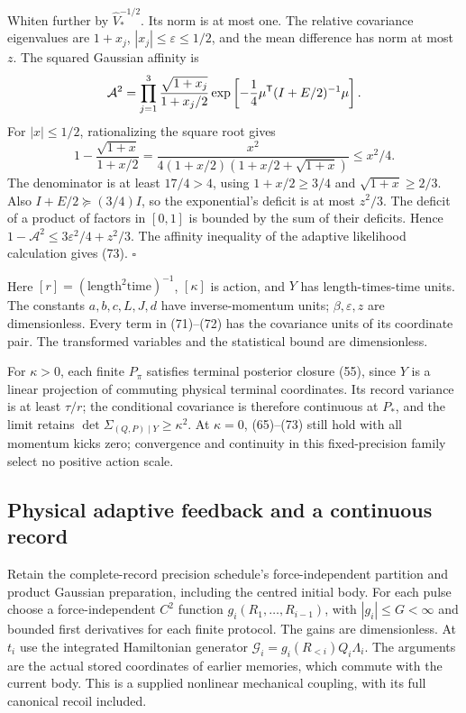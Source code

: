 \documentclass[11pt,a4paper]{article}
\begin{document}
Whiten further by \(\widehat V_*^{-1/2}\). Its norm is at most one. The
relative covariance eigenvalues are \(1+x_j\),
\(|x_j|\le\varepsilon\le1/2\), and the mean difference has norm at most
\(z\). The squared Gaussian affinity is \[\mathcal A^2=\prod_{j=1}^3
 \frac{\sqrt{1+x_j}}{1+x_j/2}
 \exp\left[-\frac14\mu^{\sf T}
                         (I+E/2)^{-1}\mu\right].\] For \(|x|\le1/2\),
rationalizing the square root gives \[1-\frac{\sqrt{1+x}}{1+x/2}
=\frac{x^2}{4(1+x/2)(1+x/2+\sqrt{1+x})}\le x^2/4.\] The denominator is
at least \(17/4>4\), using \(1+x/2\ge3/4\) and \(\sqrt{1+x}\ge2/3\).
Also \(I+E/2\succeq(3/4)I\), so the exponential's deficit is at most
\(z^2/3\). The deficit of a product of factors in \([0,1]\) is bounded
by the sum of their deficits. Hence
\(1-\mathcal A^2\le3\varepsilon^2/4+z^2/3\). The affinity inequality of
the adaptive likelihood calculation gives (73). \(\square\)

Here \([r]=(\text{length}^2\text{time})^{-1}\), \([\kappa]\) is action,
and \(Y\) has length-times-time units. The constants \(a,b,c,L,J,d\)
have inverse-momentum units; \(\beta,\varepsilon,z\) are dimensionless.
Every term in (71)--(72) has the covariance units of its coordinate
pair. The transformed variables and the statistical bound are
dimensionless.

For \(\kappa>0\), each finite \(P_\pi\) satisfies terminal posterior
closure (55), since \(Y\) is a linear projection of commuting physical
terminal coordinates. Its record variance is at least \(\tau/r\); the
conditional covariance is therefore continuous at \(P_*\), and the limit
retains \(\det\Sigma_{(Q,P)\mid Y}\ge\kappa^2\). At \(\kappa=0\),
(65)--(73) still hold with all momentum kicks zero; convergence and
continuity in this fixed-precision family select no positive action
scale.

\hypertarget{physical-adaptive-feedback-and-a-continuous-record}{%
\subsection{Physical adaptive feedback and a continuous
record}\label{physical-adaptive-feedback-and-a-continuous-record}}

Retain the complete-record precision schedule's force-independent
partition and product Gaussian preparation, including the centred
initial body. For each pulse choose a force-independent \(C^2\) function
\(g_i(R_1,\ldots,R_{i-1})\), with \(|g_i|\le G<\infty\) and bounded
first derivatives for each finite protocol. The gains are dimensionless.
At \(t_i\) use the integrated Hamiltonian generator
\(\mathcal G_i=g_i(R_{<i})Q_i\Lambda_i\). The arguments are the actual
stored coordinates of earlier memories, which commute with the current
body. This is a supplied nonlinear mechanical coupling, with its full
canonical recoil included.
\end{document}
